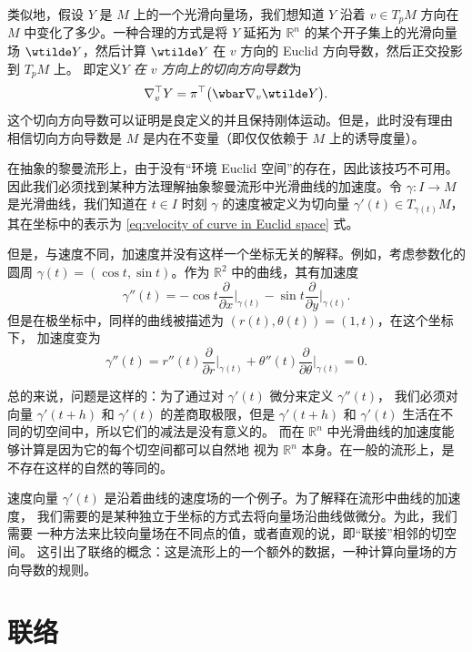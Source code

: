 类似地，假设 $Y$ 是 $M$ 上的一个光滑向量场，我们想知道 $Y$ 沿着 
$v\in T_pM$ 方向在 $M$ 中变化了多少。一种合理的方式是将 $Y$ 延拓为
$\mathbb{R}^n$ 的某个开子集上的光滑向量场 $\wtilde Y$，然后计算
$\wtilde Y$ 在 $v$ 方向的 Euclid 方向导数，然后正交投影到 $T_pM$ 上。
即定义\emph{$Y$ 在 $v$ 方向上的切向方向导数}为
\begin{equation}\label{eq:tangential directional derivative}
  \nabla_v^\top Y=\pi^\top\bigl(\wbar\nabla_v\wtilde Y\bigr).
\end{equation}
这个切向方向导数可以证明是良定义的并且保持刚体运动。但是，此时没有理由
相信切向方向导数是 $M$ 是内在不变量（即仅仅依赖于 $M$ 上的诱导度量）。

在抽象的黎曼流形上，由于没有“环境 Euclid 空间”的存在，因此该技巧不可用。
因此我们必须找到某种方法理解抽象黎曼流形中光滑曲线的加速度。令 $\gamma:I\to M$
是光滑曲线，我们知道在 $t\in I$ 时刻 $\gamma$ 的速度被定义为切向量
$\gamma'(t)\in T_{\gamma(t)}M$，其在坐标中的表示为 \eqref{eq:velocity of curve in Euclid space} 式。

但是，与速度不同，加速度并没有这样一个坐标无关的解释。例如，考虑参数化的圆周
$\gamma(t)=(\cos t,\sin t)$。作为 $\mathbb{R}^2$ 中的曲线，其有加速度
\[
  \gamma''(t)=-\cos t\frac{\partial}{\partial x}\bigg|_{\gamma(t)}
  -\sin t   \frac{\partial}{\partial y}\bigg|_{\gamma(t)}.
\]
但是在极坐标中，同样的曲线被描述为 $(r(t),\theta(t))= (1,t)$，在这个坐标下，
加速度变为
\[
  \gamma''(t)=r''(t)\frac{\partial}{\partial r}\bigg|_{\gamma(t)}   
  +\theta''(t)\frac{\partial}{\partial \theta}\bigg|_{\gamma(t)}=0.
\]

总的来说，问题是这样的：为了通过对 $\gamma'(t)$ 微分来定义 $\gamma''(t)$，
我们必须对向量 $\gamma'(t+h)$ 和 $\gamma'(t)$ 的差商取极限，但是
$\gamma'(t+h)$ 和 $\gamma'(t)$ 生活在不同的切空间中，所以它们的减法是没有意义的。
而在 $\mathbb{R}^n$ 中光滑曲线的加速度能够计算是因为它的每个切空间都可以自然地
视为 $\mathbb{R}^n$ 本身。在一般的流形上，是不存在这样的自然的等同的。

速度向量 $\gamma'(t)$ 是沿着曲线的速度场的一个例子。为了解释在流形中曲线的加速度，
我们需要的是某种独立于坐标的方式去将向量场沿曲线做微分。为此，我们需要
一种方法来比较向量场在不同点的值，或者直观的说，即“联接”相邻的切空间。
这引出了联络的概念：这是流形上的一个额外的数据，一种计算向量场的方向导数的规则。

\section{联络}

